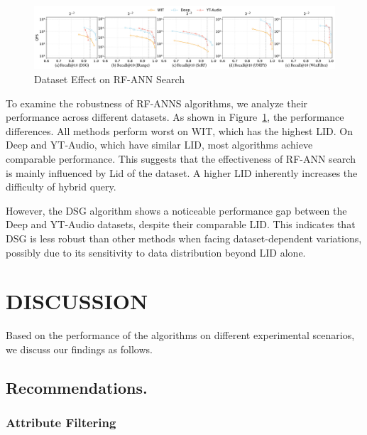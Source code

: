 \documentclass[sigconf, nonacm]{acmart}
\begin{document}
\begin{sloppypar}
%     
\begin{figure}[htbp]
    \centering
    \setlength{\abovecaptionskip}{0cm}
    \setlength{\belowcaptionskip}{-0.5cm}
    \includegraphics[width=\textwidth]{figures/exp/exp_8_3.pdf}
    \caption{Dataset Effect on RF-ANN Search}
    \label{fig:exp_8_3}
\end{figure}


To examine the robustness of RF-ANNS algorithms, we analyze their performance across different datasets. As shown in Figure~\ref{fig:exp_8_3}, the performance differences. All methods perform worst on WIT, which has the highest LID. On Deep and YT-Audio, which have similar LID, most algorithms achieve comparable performance. 
This suggests that the effectiveness of RF-ANN search is mainly influenced by Lid of the dataset. A higher LID inherently increases the difficulty of hybrid query.

However, the DSG algorithm shows a noticeable performance gap between the Deep and YT-Audio datasets, despite their comparable LID. This indicates that DSG is less robust than other methods when facing dataset-dependent variations, possibly due to its sensitivity to data distribution beyond LID alone.

\section{DISCUSSION}
Based on the performance of the algorithms on different experimental scenarios, we discuss our findings as follows.


\subsection{Recommendations.}
\subsubsection{\textbf{Attribute Filtering}}



\end{sloppypar}
\end{document}
